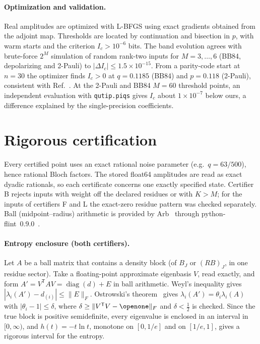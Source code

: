 \documentclass[aps,pra,reprint,superscriptaddress,nofootinbib,longbibliography,floatfix]{revtex4-2}
\theoremstyle{remark}
\newcommand{\diag}{\operatorname{diag}}
\newcommand{\one}{\openone}
\newcommand{\Ic}{I_c}
\begin{document}
\paragraph*{Optimization and validation.} Real amplitudes are optimized with L-BFGS using exact
gradients obtained from the adjoint map. Thresholds are located by continuation and bisection in $p$,
with warm starts and the criterion $\Ic>10^{-6}$ bits. The band evolution agrees with brute-force
$2^M$ simulation of random rank-two inputs for $M=3,\dots,6$ (BB84, depolarizing and 2-Pauli) to
$|\Delta\Ic|\le1.5\times10^{-15}$. From a parity-code start at $n=30$ the optimizer finds $\Ic>0$ at $q=0.1185$ (BB84) and $p=0.118$
(2-Pauli), consistent with Ref.~\cite{agarwal2026symmetry}. At the 2-Pauli and BB84 $M=60$ threshold
points, an independent evaluation with \texttt{qutip.piqs} gives $\Ic$ about $1\times10^{-7}$ below
ours, a difference explained by the single-precision coefficients.

\section{Rigorous certification}
\label{sec:certify}

Every certified point uses an exact rational noise parameter (e.g.\ $q=63/500$), hence rational Bloch
factors. The stored float64 amplitudes are read as exact dyadic rationals, so each certificate concerns
one exactly specified state. Certifier B rejects inputs with weight off the declared residues or with
$K>M$; for the inputs of certifiers F and L the exact-zero residue pattern was checked separately. Ball (midpoint--radius) arithmetic is provided by Arb~\cite{johansson2017arb} through
python-flint~0.9.0~\cite{pythonflint}.

\paragraph*{Entropy enclosure (both certifiers).} Let $A$ be a ball matrix that contains a density block
(of $B_J$ or $(RB)_J$, in one residue sector). Take a floating-point approximate eigenbasis $V$, read
exactly, and form $A'=V^{\mathsf T}AV=\diag(d)+E$ in ball arithmetic. Weyl's inequality gives
$|\lambda_i(A')-d_{(i)}|\le\|E\|_F$. Ostrowski's theorem~\cite{hornjohnson2012} gives
$\lambda_i(A')=\theta_i\lambda_i(A)$ with $|\theta_i-1|\le\delta$, where
$\delta\ge\|V^{\mathsf T}V-\one\|_F$ and $\delta<\frac12$ is checked. Since the true block is positive
semidefinite, every eigenvalue is enclosed in an interval in $[0,\infty)$, and
$h(t)=-t\ln t$, monotone on $[0,1/e]$ and on $[1/e,1]$, gives a rigorous interval for the entropy.
\end{document}
